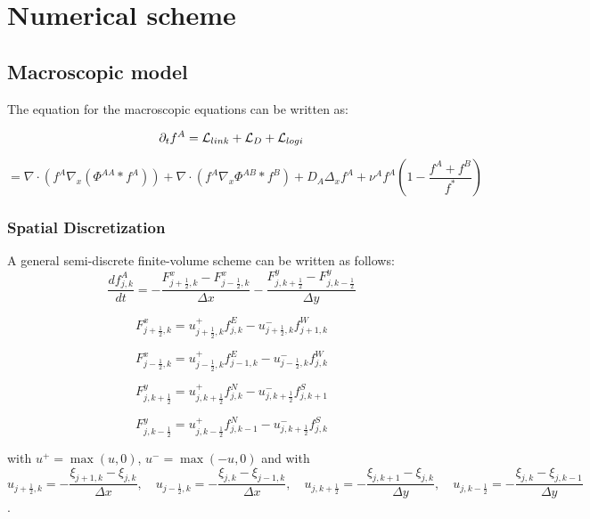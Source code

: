 	\section{Numerical scheme}
	\subsection{Macroscopic model}
	
The equation for the macroscopic equations can be written as:

\begin{equation}
 {\partial}_t f^{A}={\mathcal{L}_{link}}+{\mathcal{L}_{D}}+{\mathcal{L}_{logi}}
\end{equation}


\begin{equation}
 =  \nabla \cdot (f^A\nabla_x(\Phi^{AA}* f^A)) + \nabla \cdot (f^A \nabla_x \Phi^{AB}*f^B) + D_A \Delta_x f^A + \nu^{A}f^A\left( 1-\frac{f^A+f^B}{f^{*}} \right)
\end{equation}



\subsubsection{Spatial Discretization}


A general semi-discrete finite-volume scheme can be written as follows:
\begin{equation}
\frac{d f^{A}_{j,k}}{dt}= -\frac{F^{x}_{j+\frac{1}{2},k}-F^{x}_{j-\frac{1}{2},k}}{\Delta x}-\frac{F^{y}_{j,k+\frac{1}{2}}-F^{y}_{j,k-\frac{1}{2}}}{\Delta y}
\end{equation}

$$ F^{x}_{j+\frac{1}{2},k}=u^{+}_{j+\frac{1}{2},k}f^{E}_{j,k}-
u^{-}_{j+\frac{1}{2},k}f^{W}_{j+1,k}   $$

$$ F^{x}_{j-\frac{1}{2},k}=u^{+}_{j-\frac{1}{2},k}f^{E}_{j-1,k}-
u^{-}_{j-\frac{1}{2},k}f^{W}_{j,k}   $$

$$ F^{y}_{j,k+\frac{1}{2}}=u^{+}_{j,k+\frac{1}{2}}f^{N}_{j,k}-
u^{-}_{j,k+\frac{1}{2}}f^{S}_{j,k+1}   $$

$$ F^{y}_{j,k-\frac{1}{2}}=u^{+}_{j,k-\frac{1}{2}}f^{N}_{j,k-1}-
u^{-}_{j,k+\frac{1}{2}}f^{S}_{j,k}   $$

with $u^{+}=\max(u,0)$, $u^{-}=\max(-u,0)$ and with $$u_{j+\frac{1}{2},k}=-\frac{\xi_{j+1,k}-\xi_{j,k}}{\Delta x}, \quad u_{j-\frac{1}{2},k}=-\frac{\xi_{j,k}-\xi_{j-1,k}}{\Delta x}, \quad u_{j,k+\frac{1}{2}}=-\frac{\xi_{j,k+1}-\xi_{j,k}}{\Delta y}, \quad u_{j,k-\frac{1}{2}}=-\frac{\xi_{j,k}-\xi_{j,k-1}}{\Delta y}$$. \\

